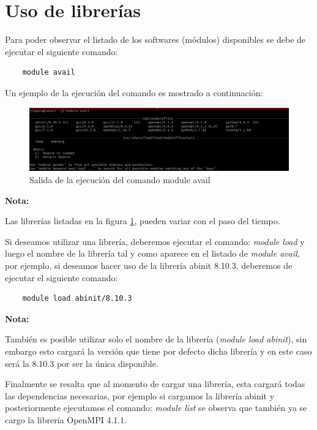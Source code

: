 \documentclass[a4paper,11pt]{article}
\newenvironment{note}
{
    \vspace{0.22cm}
    \noindent
    \textbf{Nota: }
}
{
    \vspace{0.22cm}
}
\begin{document}
\section{Uso de librerías}

Para poder observar el listado de los softwares (módulos) disponibles se debe de ejecutar el siguiente comando:

\begin{lstlisting}
    module avail
\end{lstlisting}

Un ejemplo de la ejecución del comando es mostrado a continuación:

\begin{figure}[!ht]
    \centering
    \includegraphics[width=14cm]{module_avail}
    \caption{Salida de la ejecución del comando module avail}
    \label{fig:module_avail}
\end{figure}

\begin{note}
    Las librerías listadas en la figura \ref{fig:module_avail}, pueden variar con el paso del tiempo.
\end{note}

Si deseamos utilizar una librería, deberemos ejecutar el comando: \textit{module load } y luego el nombre de la librería tal y como aparece en el listado de \textit{module avail}, por ejemplo, si deseamos hacer uso de la librería abinit 8.10.3, deberemos de ejecutar el siguiente comando:

\begin{lstlisting}
    module load abinit/8.10.3
\end{lstlisting}

\begin{note}
    También es posible utilizar solo el nombre de la librería (\textit{module load abinit}), sin embargo esto cargará la versión que tiene por defecto dicha librería y en este caso será la 8.10.3 por ser la única disponible.
\end{note}

Finalmente se resalta que al momento de cargar una librería, esta cargará todas las dependencias necesarias, por ejemplo si cargamos la librería abinit y posteriormente ejecutamos el comando: \textit{module list} se observa que también ya se cargo la librería OpenMPI 4.1.1.
\end{document}

